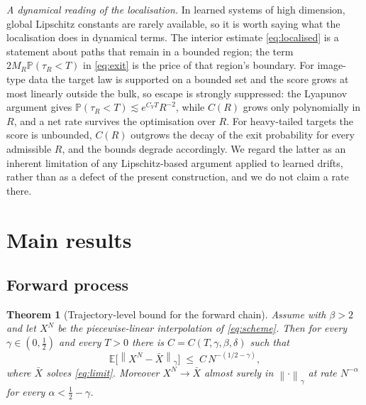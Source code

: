 \documentclass[a4paper,fleqn]{cas-dc}
\newtheorem{theorem}{Theorem}[section]
\theoremstyle{definition}
\newcommand{\E}{\mathbb{E}}
\newcommand{\PP}{\mathbb{P}}
\newcommand{\norm}[1]{\left\lVert#1\right\rVert}
\newcommand{\holder}[1]{\norm{#1}_{\gamma}}
\begin{document}
\emph{A dynamical reading of the localisation.} In learned systems of high dimension,
global Lipschitz constants are rarely available, so it is worth saying what the
localisation does in dynamical terms. The interior estimate \eqref{eq:localised} is a
statement about paths that remain in a bounded region; the term $2M_{R}\PP(\tau_{R}<T)$
in \eqref{eq:exit} is the price of that region's boundary. For image-type data the
target law is supported on a bounded set and the score grows at most linearly outside
the bulk, so escape is strongly suppressed: the Lyapunov argument gives
$\PP(\tau_{R}<T)\lesssim e^{C_{V}T}R^{-2}$, while $C(R)$ grows only polynomially in
$R$, and a net rate survives the optimisation over $R$. For heavy-tailed targets the
score is unbounded, $C(R)$ outgrows the decay of the exit probability for every
admissible $R$, and the bounds degrade accordingly. We regard the latter as an
inherent limitation of any Lipschitz-based argument applied to learned drifts, rather
than as a defect of the present construction, and we do not claim a rate there.

\section{Main results}
\label{sec:main}

\subsection{Forward process}

\begin{theorem}[Trajectory-level bound for the forward chain]
\label{thm:forward}
Assume  with $\beta>2$ and let $X^{N}$ be the
piecewise-linear interpolation of \eqref{eq:scheme}. Then for every
$\gamma\in(0,\tfrac12)$ and every $T>0$ there is $C=C(T,\gamma,\beta,\delta)$ such that
\begin{equation}
\E\bigl[\holder{X^{N}-\bar X}\bigr]
\;\le\; C\,N^{-(1/2-\gamma)},
\label{eq:rate-forward}
\end{equation}
where $\bar X$ solves \eqref{eq:limit}. Moreover $X^{N}\to\bar X$ almost surely in
$\holder{\cdot}$ at rate $N^{-\alpha}$ for every $\alpha< \tfrac12-\gamma$.
\end{theorem}
\end{document}
